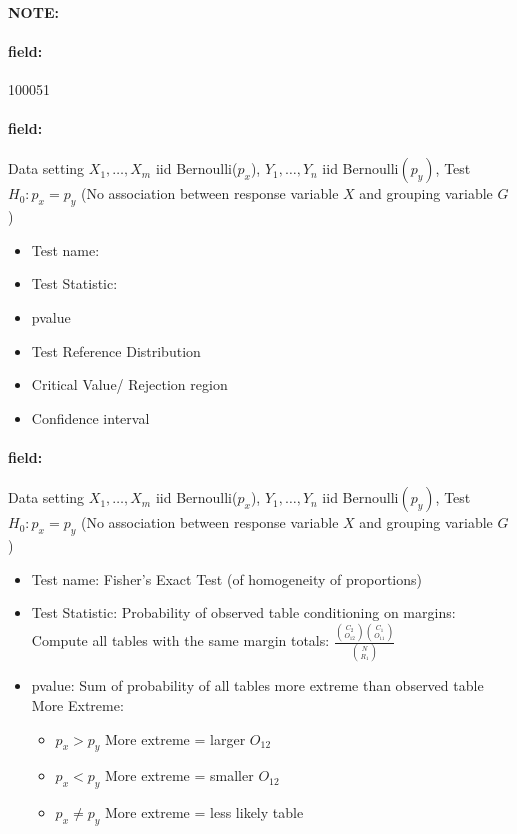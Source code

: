 \documentclass[12pt]{article}
\newenvironment{note}{\paragraph{NOTE:}}{}
\newenvironment{field}{\paragraph{field:}}{}
\begin{document}
\begin{note} \begin{field} \tiny 100051 \end{field}
 \begin{field}
  Data setting $X_1, \ldots , X_m$ iid Bernoulli($p_x$), $Y_1, \ldots, Y_n$ iid Bernoulli$(p_y)$, Test $H_0: p_x = p_y $ (No association between response variable $X$ and grouping variable $G$)
  \begin{itemize}
   \item Test name:
   \item Test Statistic:
   \item pvalue
   \item Test Reference Distribution
   \item Critical Value/ Rejection region
   \item Confidence interval
  \end{itemize}
 \end{field}
 \begin{field}
  Data setting $X_1, \ldots , X_m$ iid Bernoulli($p_x$), $Y_1, \ldots, Y_n$ iid Bernoulli$(p_y)$, Test $H_0: p_x = p_y $ (No association between response variable $X$ and grouping variable $G$)
  \begin{itemize}
   \item Test name: Fisher's Exact Test (of homogeneity of proportions)
   \item Test Statistic: Probability of observed table conditioning on margins: Compute all tables with the same margin totals: $\frac{\binom{C_2}{O_{12}}\binom{C_1}{O_{11}}}{\binom{N}{R_1}}$
   \item pvalue: Sum of probability of all tables more extreme than observed table
         More Extreme:
         \begin{itemize}
          \item $p_x > p_y$ More extreme = larger $O_{12}$
          \item $p_x < p_y$ More extreme = smaller $O_{12}$
          \item $p_x \neq p_y$ More extreme = less likely table
         \end{itemize}
  \end{itemize}
 \end{field}
\end{note}
\end{document}
